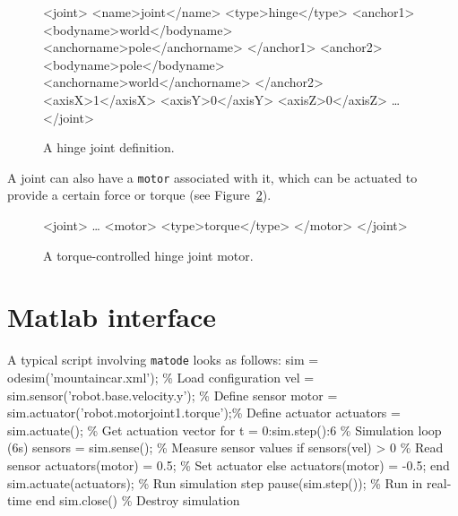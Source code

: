 \documentclass{article}
\newcommand{\txt}[1]{\texttt{#1}}
\newcommand{\matode}{\txt{matode}\xspace}
\newcommand{\tab}{\hspace{3em}}
\newcommand{\ms}[1]{\textcolor{matlab-string}{#1}}
\newcommand{\mk}[1]{\textcolor{matlab-keyword}{#1}}
\newcommand{\mc}[1]{\textcolor{matlab-comment}{#1}}
\newcommand{\xt}[1]{\textcolor{matlab-keyword}{<#1>}}
\newenvironment{code}{\alltt\small}{\endalltt}
\newenvironment{boxedcode}{\begin{boxedminipage}{\linewidth}\begin{code}}{\end{code}\end{boxedminipage}}
\begin{document}
\begin{figure}[h!]
\begin{boxedcode}
\xt{joint}
\tab\xt{name}joint\xt{/name}
\tab\xt{type}hinge\xt{/type}
\tab\xt{anchor1}
\tab\tab\xt{bodyname}world\xt{/bodyname}
\tab\tab\xt{anchorname}pole\xt{/anchorname} 
\tab\xt{/anchor1}
\tab\xt{anchor2}
\tab\tab\xt{bodyname}pole\xt{/bodyname}
\tab\tab\xt{anchorname}world\xt{/anchorname}
\tab\xt{/anchor2}
\tab\xt{axisX}1\xt{/axisX}  
\tab\xt{axisY}0\xt{/axisY}
\tab\xt{axisZ}0\xt{/axisZ}
\tab\ldots
\xt{/joint}
\end{boxedcode}
\caption{A hinge joint definition.}
\label{fig:lambda:joint}
\end{figure} 
 
A joint can also have a \txt{motor} associated with it, which can be actuated to provide a certain force or torque (see Figure~\ref{fig:lambda:motor}).

\begin{figure}[h!]
\begin{boxedcode}
\xt{joint}
\tab\ldots
\tab\xt{motor}
\tab\tab\xt{type}torque\xt{/type}
\tab\xt{/motor}
\xt{/joint}
\end{boxedcode}
\caption{A torque-controlled hinge joint motor.}
\label{fig:lambda:motor}
\end{figure}

\section{Matlab interface}

A typical script involving \matode looks as follows:
\begin{code}
sim = odesim(\ms{'mountaincar.xml'});                 \mc{\% Load configuration}
vel = sim.sensor(\ms{'robot.base.velocity.y'});       \mc{\% Define sensor}
motor = sim.actuator(\ms{'robot.motorjoint1.torque'});\mc{\% Define actuator}
actuators = sim.actuate();                       \mc{\% Get actuation vector}
\mk{for} t = 0:sim.step():6                           \mc{\% Simulation loop (6s)}
  sensors = sim.sense();                         \mc{\% Measure sensor values}
  \mk{if} sensors(vel) > 0                            \mc{\% Read sensor}
    actuators(motor) = 0.5;                      \mc{\% Set actuator}
  \mk{else}
    actuators(motor) = -0.5;
  \mk{end}
  sim.actuate(actuators);                        \mc{\% Run simulation step}
  pause(sim.step());                             \mc{\% Run in real-time}
\mk{end}
sim.close()                                      \mc{\% Destroy simulation}
\end{code}
\end{document}
